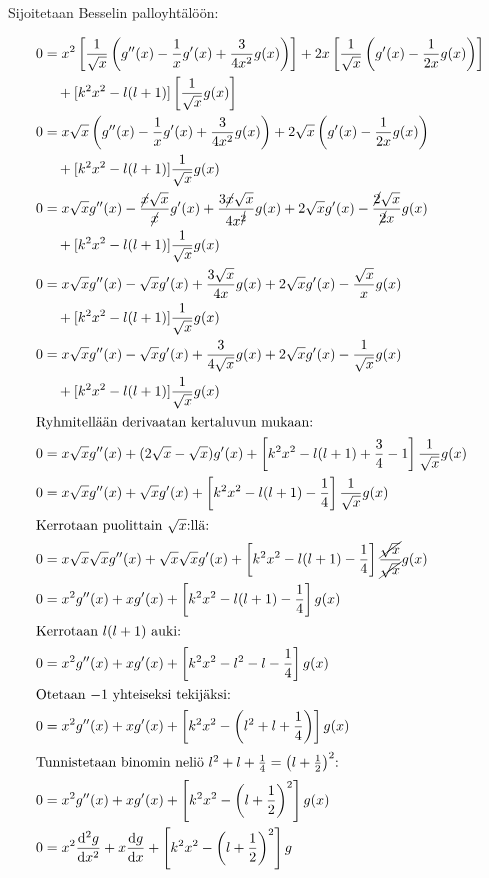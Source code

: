 \documentclass[../johdoksia.tex]{subfiles}
\begin{document}
	Sijoitetaan Besselin palloyhtälöön:
	
	\begin{align*}
		0 &= x^2\left[\frac{1}{\sqrt{x}}\left(g''(x) - \frac{1}{x}g'(x) + \frac{3}{4x^2}g(x)\right)\right] + 2x\left[\frac{1}{\sqrt{x}}\left(g'(x) - \frac{1}{2x}g(x)\right)\right] \\
		&\quad + [k^2x^2 - l(l + 1)]\left[\frac{1}{\sqrt{x}}g(x)\right] \\
		0 &= x\sqrt{x}\left(g''(x) - \frac{1}{x}g'(x) + \frac{3}{4x^2}g(x)\right) + 2\sqrt{x}\left(g'(x) - \frac{1}{2x}g(x)\right) \\
		&\quad + [k^2x^2 - l(l + 1)]\frac{1}{\sqrt{x}}g(x) \\
		0 &= x\sqrt{x}g''(x) - \frac{\cancel{x}\sqrt{x}}{\cancel{x}}g'(x) + \frac{3\cancel{x}\sqrt{x}}{4x^{\cancel{2}}}g(x) + 2\sqrt{x}g'(x) - \frac{\cancel{2}\sqrt{x}}{\cancel{2}x}g(x) \\
		&\quad + [k^2x^2 - l(l + 1)]\frac{1}{\sqrt{x}}g(x) \\
		0 &= x\sqrt{x}g''(x) - \sqrt{x}g'(x) + \frac{3\sqrt{x}}{4x}g(x) + 2\sqrt{x}g'(x) - \frac{\sqrt{x}}{x}g(x) \\
		&\quad + [k^2x^2 - l(l + 1)]\frac{1}{\sqrt{x}}g(x) \\
		0 &= x\sqrt{x}g''(x) - \sqrt{x}g'(x) + \frac{3}{4\sqrt{x}}g(x) + 2\sqrt{x}g'(x) - \frac{1}{\sqrt{x}}g(x) \\
		&\quad + [k^2x^2 - l(l + 1)]\frac{1}{\sqrt{x}}g(x) \\
		\intertext{Ryhmitellään derivaatan kertaluvun mukaan:}
		0 &= x\sqrt{x}g''(x) + (2\sqrt{x} - \sqrt{x})g'(x) + \left[k^2x^2 - l(l + 1) + \frac{3}{4} - 1\right]\frac{1}{\sqrt{x}}g(x) \\
		0 &= x\sqrt{x}g''(x) + \sqrt{x}g'(x) + \left[k^2x^2 - l(l + 1) - \frac{1}{4}\right]\frac{1}{\sqrt{x}}g(x) \\
		\intertext{Kerrotaan puolittain $\sqrt{x}$:llä:}
		0 &= x\sqrt{x}\sqrt{x}g''(x) + \sqrt{x}\sqrt{x}g'(x) + \left[k^2x^2 - l(l + 1) - \frac{1}{4}\right]\frac{\cancel{\sqrt{x}}}{\cancel{\sqrt{x}}}g(x) \\
		0 &= x^2g''(x) + xg'(x) + \left[k^2x^2 - l(l + 1) - \frac{1}{4}\right]g(x) \\
		\intertext{Kerrotaan $l(l + 1)$ auki:}
		0 &= x^2g''(x) + xg'(x) + \left[k^2x^2 - l^2 - l - \frac{1}{4}\right]g(x) \\
		\intertext{Otetaan $-1$ yhteiseksi tekijäksi:}
		0 &= x^2g''(x) + xg'(x) + \left[k^2x^2 - \left(l^2 + l + \frac{1}{4}\right)\right]g(x) \\
		\intertext{Tunnistetaan binomin neliö $l^2 + l + \frac{1}{4} = \left(l + \frac{1}{2}\right)^2$:}
		0 &= x^2g''(x) + xg'(x) + \left[k^2x^2 - \left(l + \frac{1}{2}\right)^2\right]g(x) \\
		0 &= x^2\odv{^2g}{x^2} + x\odv{g}{x} + \left[k^2x^2 - \left(l + \frac{1}{2}\right)^2\right]g
	\end{align*}
	
\end{document}

